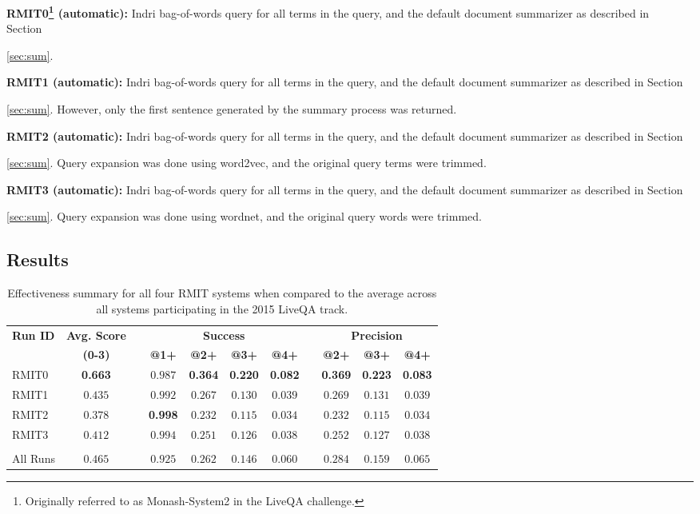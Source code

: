 \documentclass[a4paper,10pt,conference,compsocconf,final]{IEEEtran}
\newcommand\method[1]{{\sf\small{#1}}}
\begin{document}
\noindent\textbf{RMIT0\footnote{Originally referred to as Monash-System2 in the LiveQA challenge.} (automatic): }
Indri bag-of-words query for all terms in the query, and the default
document summarizer as described in Section~{\ref{sec:sum}.

\medskip

\noindent\textbf{RMIT1 (automatic): }
Indri bag-of-words query for all terms in the query, and the default
document summarizer as described in Section~{\ref{sec:sum}.
However, only the first sentence generated by the summary process
was returned.

\medskip

\noindent\textbf{RMIT2 (automatic): }
Indri bag-of-words query for all terms in the query, and the default
document summarizer as described in Section~{\ref{sec:sum}.
Query expansion was done using \method{word2vec}, and the original query terms were trimmed.

\medskip

\noindent\textbf{RMIT3 (automatic): }
Indri bag-of-words query for all terms in the query, and the default
document summarizer as described in Section~{\ref{sec:sum}.
Query expansion was done using \method{wordnet}, and the original query words were trimmed.

\medskip

\subsection{Results}

\begin{table*}[t]
\centering
\caption{
Effectiveness summary for all four RMIT systems when compared to the
average across all systems participating in the 2015 LiveQA track.
\label{tab:runs}}
\begin{tabular}{lcccccccccc}
\toprule
\multirow{2}{*}{\bf Run ID} & {\bf Avg. Score} && \multicolumn{4}{c}{\bf Success} && \multicolumn{3}{c}{\bf Precision} \\
& {\bf (0-3)} && {\bf @1+} & {\bf @2+} & {\bf @3+} & {\bf @4+} && {\bf @2+} & {\bf @3+} & {\bf @4+} \\
\midrule
RMIT0 &{\bf 0.663}&&$0.987$&{\bf 0.364}&{\bf 0.220}&{\bf 0.082}&&{\bf 0.369}&{\bf 0.223}&{\bf 0.083}\\
RMIT1 &$0.435$&&$0.992$&$0.267$&$0.130$&$0.039$&&$0.269$&$0.131$&$0.039$\\
RMIT2 &$0.378$&&{\bf 0.998}&$0.232$&$0.115$&$0.034$&&$0.232$&$0.115$&$0.034$\\
RMIT3 &$0.412$&&$0.994$&$0.251$&$0.126$&$0.038$&&$0.252$&$0.127$&$0.038$\\
&&&&&&&&&\\
All Runs  &$0.465$&&$0.925$&$0.262$&$0.146$&$0.060$&&$0.284$&$0.159$&$0.065$\\
\bottomrule
\end{tabular}
\end{table*}

}}}}
\end{document}
